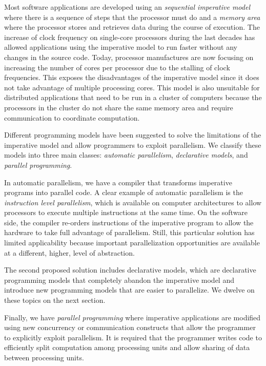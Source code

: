 Most software applications are developed using an \emph{sequential imperative
model} where there is a sequence of steps that the processor must do and a
\emph{memory area} where the processor stores and retrieves data during the
course of execution.  The increase of clock frequency on single-core processors
during the last decades has allowed applications using the imperative model to
run faster without any changes in the source code. Today, processor manufactures
are now focusing on increasing the number of cores per processor due to the
stalling of clock frequencies. This exposes the disadvantages of the imperative
model since it does not take advantage of multiple processing cores. This model
is also unsuitable for distributed applications that need to be run in a cluster
of computers because the processors in the cluster do not share the same memory
area and require communication to coordinate computation.

Different programming models have been suggested to solve the limitations of the
imperative model and allow programmers to exploit parallelism. We classify these
models into three main classes: \emph{automatic parallelism}, \emph{declarative models}, and
\emph{parallel programming}.

In automatic parallelism, we have a compiler that transforms imperative programs
into parallel code. A clear example of automatic parallelism is the
\emph{instruction level parallelism}, which is available on computer
architectures to allow processors to execute multiple instructions at the same
time. On the software side, the compiler re-orders instructions of the
imperative program to allow the hardware to take full advantage of parallelism.
Still, this particular solution has limited applicability because important
parallelization opportunities are available at a different, higher, level of abstraction.

The second proposed solution includes declarative models, which are declarative
programming models that completely abandon the imperative model and introduce
new programming models that are easier to parallelize. We dwelve on these topics
on the next section.

Finally, we have \emph{parallel programming} where imperative applications are
modified using new concurrency or communication constructs that allow the
programmer to explicitly exploit parallelism. It is required that the programmer
writes code to efficiently split computation among processing units and allow
sharing of data between processing units.

